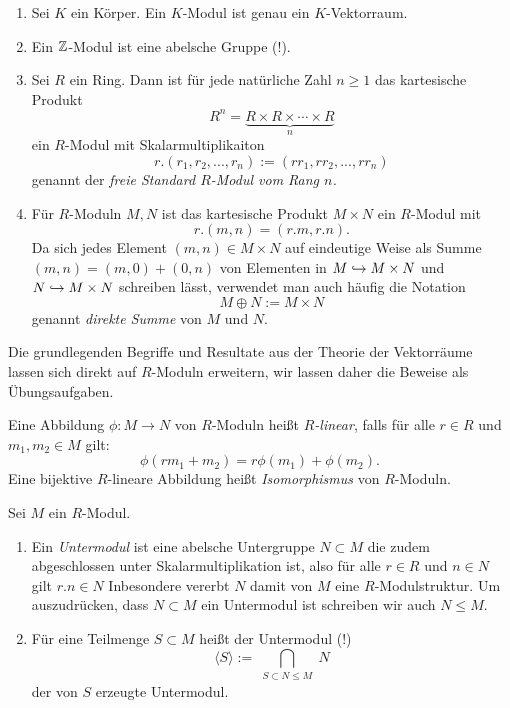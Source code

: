 \documentclass{book}
\begin{document}
\begin{exas}
    \label{exas:moduln}
    \begin{enumerate}
    \item Sei $K$ ein Körper. Ein $K$-Modul ist genau ein $K$-Vektorraum.
    \item Ein $\mathbb{Z}$-Modul ist eine abelsche Gruppe (!).
    \item Sei $R$ ein Ring. Dann ist für jede natürliche Zahl $n \ge 1$ das kartesische Produkt 
        \[
            R^n = \underbrace{R \times R \times \cdots \times R}_{n}
        \]
        ein $R$-Modul mit Skalarmultiplikaiton 
        \[
            r.(r_1,r_2,...,r_n) := (rr_1,rr_2,...,rr_n)
        \]
        genannt der \emph{freie Standard $R$-Modul vom Rang $n$.}
    \item Für $R$-Moduln $M,N$ ist das kartesische Produkt $M \times N$ ein $R$-Modul mit
        \[
            r.(m,n) = (r.m,r.n).
        \]
        Da sich jedes Element $(m,n) \in M \times N$ auf eindeutige Weise als
        Summe $(m,n) = (m,0) + (0,n)$ von Elementen in $M \hookrightarrow M \times N$ und $N \hookrightarrow M \times N$ schreiben
        lässt, verwendet man auch häufig die Notation 
        \[
            M \oplus N := M \times N
        \]
        genannt \emph{direkte Summe} von $M$ und $N$.
    \end{enumerate}
\end{exas}

Die grundlegenden Begriffe und Resultate aus der Theorie der Vektorräume lassen sich direkt
auf $R$-Moduln erweitern, wir lassen daher die Beweise als Übungsaufgaben.

\begin{defi}
    \label{defi:hom}
    Eine Abbildung $\phi: M \to N$ von $R$-Moduln heißt \emph{$R$-linear}, falls für
    alle $r \in R$ und $m_1,m_2 \in M$ gilt:
    \[
        \phi(r m_1 + m_2 ) = r \phi(m_1) + \phi(m_2).
    \]
    Eine bijektive $R$-lineare Abbildung heißt \emph{Isomorphismus} von
    $R$-Moduln.
\end{defi}

\begin{defi}
    \label{defi:unter}
    Sei $M$ ein $R$-Modul. 

    \begin{enumerate}
        \item Ein \emph{Untermodul} ist eine abelsche Untergruppe $N
    \subset M$ die zudem abgeschlossen unter Skalarmultiplikation ist, also für
    alle $r \in R$ und $n \in N$ gilt $r.n \in N$ Inbesondere vererbt $N$ damit
    von $M$ eine $R$-Modulstruktur. Um auszudrücken, dass $N \subset M$ ein
    Untermodul ist schreiben wir auch $N \le M$. 
        \item Für eine Teilmenge $S \subset M$ heißt der Untermodul (!)
            \[
                \langle S \rangle := \bigcap_{\substack{S \subset N \le M }} N
            \]
            der von $S$ erzeugte Untermodul. 
    \end{enumerate} 
\end{defi}
\end{document}
